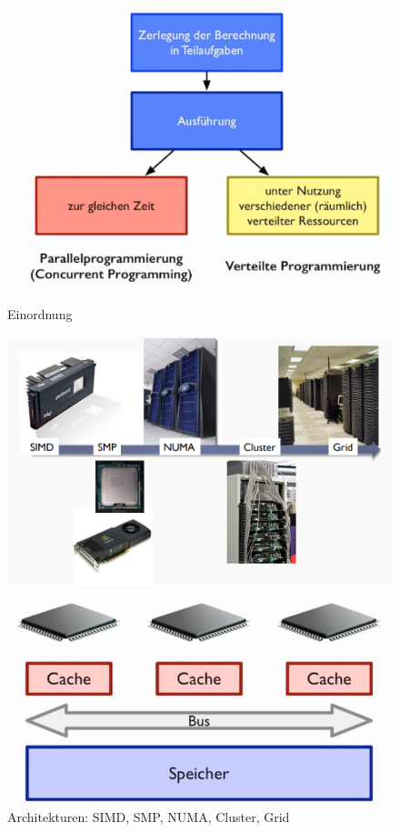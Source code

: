 \documentclass[10pt]{article}
\begin{document}
  \begin{figure}[!tbp]
    \centering
    \begin{minipage}[b]{0.45\textwidth}
      \includegraphics[width=1.0\linewidth]{Assets/Programmierparadigmen-einordnung-programmierung}
      \caption{Einordnung}
    \end{minipage}
    \hfill
    \begin{minipage}[b]{0.45\textwidth}
      \includegraphics[width=1.0\linewidth]{Assets/Programmierparadigmen-Architekturen}
      \caption{Architekturen: SIMD, SMP, NUMA, Cluster, Grid}
    \end{minipage}
    \vfill
    \begin{minipage}[b]{0.45\textwidth}
      \includegraphics[width=1.0\linewidth]{Assets/Programmierparadigmen-Multiprozessorsysteme}

\end{minipage}
\end{figure}
\end{document}

